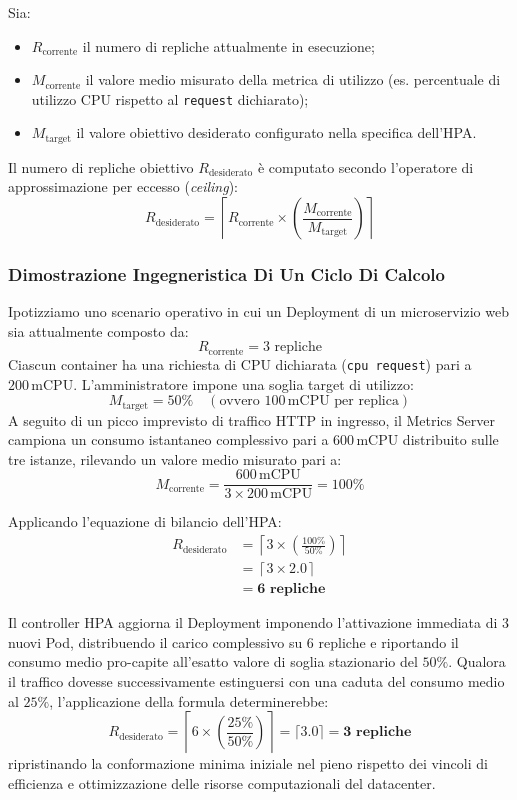 \documentclass[11pt, a4paper]{article}
\begin{document}
Sia:
\begin{itemize}[noitemsep]
    \item $R_{\text{corrente}}$ il numero di repliche attualmente in esecuzione;
    \item $M_{\text{corrente}}$ il valore medio misurato della metrica di utilizzo (es. percentuale di utilizzo CPU rispetto al \texttt{request} dichiarato);
    \item $M_{\text{target}}$ il valore obiettivo desiderato configurato nella specifica dell'HPA.
\end{itemize}

Il numero di repliche obiettivo $R_{\text{desiderato}}$ è computato secondo l'operatore di approssimazione per eccesso (\emph{ceiling}):
\[
    \boxed{R_{\text{desiderato}} = \left\lceil R_{\text{corrente}} \times \left( \frac{M_{\text{corrente}}}{M_{\text{target}}} \right) \right\rceil}
\]

\subsubsection{Dimostrazione Ingegneristica Di Un Ciclo Di Calcolo}
Ipotizziamo uno scenario operativo in cui un Deployment di un microservizio web sia attualmente composto da:
\[
    R_{\text{corrente}} = 3 \text{ repliche}
\]
Ciascun container ha una richiesta di CPU dichiarata (\texttt{cpu request}) pari a $200\,\text{mCPU}$. L'amministratore impone una soglia target di utilizzo:
\[
    M_{\text{target}} = 50\% \quad (\text{ovvero } 100\,\text{mCPU per replica})
\]
A seguito di un picco imprevisto di traffico HTTP in ingresso, il Metrics Server campiona un consumo istantaneo complessivo pari a $600\,\text{mCPU}$ distribuito sulle tre istanze, rilevando un valore medio misurato pari a:
\[
    M_{\text{corrente}} = \frac{600\,\text{mCPU}}{3 \times 200\,\text{mCPU}} = 100\%
\]

Applicando l'equazione di bilancio dell'HPA:
\begin{align*}
    R_{\text{desiderato}} &= \left\lceil 3 \times \left( \frac{100\%}{50\%} \right) \right\rceil \\
    &= \left\lceil 3 \times 2.0 \right\rceil \\
    &= \mathbf{6 \text{ repliche}}
\end{align*}

Il controller HPA aggiorna il Deployment imponendo l'attivazione immediata di 3 nuovi Pod, distribuendo il carico complessivo su 6 repliche e riportando il consumo medio pro-capite all'esatto valore di soglia stazionario del $50\%$. Qualora il traffico dovesse successivamente estinguersi con una caduta del consumo medio al $25\%$, l'applicazione della formula determinerebbe:
\[
    R_{\text{desiderato}} = \left\lceil 6 \times \left( \frac{25\%}{50\%} \right) \right\rceil = \lceil 3.0 \rceil = \mathbf{3 \text{ repliche}}
\]
ripristinando la conformazione minima iniziale nel pieno rispetto dei vincoli di efficienza e ottimizzazione delle risorse computazionali del datacenter.
\end{document}
